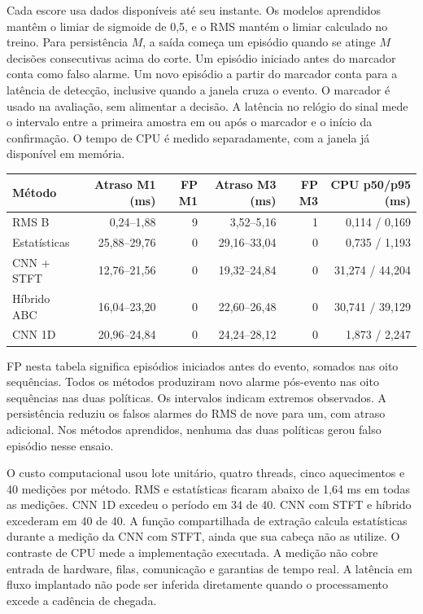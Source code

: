 \documentclass[11pt,a4paper]{article}
\begin{document}
Cada escore usa dados disponíveis até seu instante. Os modelos aprendidos mantêm o limiar de sigmoide de 0,5, e o RMS mantém o limiar calculado no treino. Para persistência $M$, a saída começa um episódio quando se atinge $M$ decisões consecutivas acima do corte. Um episódio iniciado antes do marcador conta como falso alarme. Um novo episódio a partir do marcador conta para a latência de detecção, inclusive quando a janela cruza o evento. O marcador é usado na avaliação, sem alimentar a decisão. A latência no relógio do sinal mede o intervalo entre a primeira amostra em ou após o marcador e o início da confirmação. O tempo de CPU é medido separadamente, com a janela já disponível em memória.

\begin{center}
\small
\begin{tabular}{@{}lrrrrr@{}}\toprule
Método & Atraso M1 (ms) & FP M1 & Atraso M3 (ms) & FP M3 & CPU p50/p95 (ms)\\\midrule
RMS B & 0,24--1,88 & 9 & 3,52--5,16 & 1 & 0,114 / 0,169\\
Estatísticas & 25,88--29,76 & 0 & 29,16--33,04 & 0 & 0,735 / 1,193\\
CNN + STFT & 12,76--21,56 & 0 & 19,32--24,84 & 0 & 31,274 / 44,204\\
Híbrido ABC & 16,04--23,20 & 0 & 22,60--26,48 & 0 & 30,741 / 39,129\\
CNN 1D & 20,96--24,84 & 0 & 24,24--28,12 & 0 & 1,873 / 2,247\\\bottomrule
\end{tabular}
\end{center}
FP nesta tabela significa episódios iniciados antes do evento, somados nas oito sequências. Todos os métodos produziram novo alarme pós-evento nas oito sequências nas duas políticas. Os intervalos indicam extremos observados. A persistência reduziu os falsos alarmes do RMS de nove para um, com atraso adicional. Nos métodos aprendidos, nenhuma das duas políticas gerou falso episódio nesse ensaio.

O custo computacional usou lote unitário, quatro threads, cinco aquecimentos e 40 medições por método. RMS e estatísticas ficaram abaixo de 1,64 ms em todas as medições. CNN 1D excedeu o período em 34 de 40. CNN com STFT e híbrido excederam em 40 de 40. A função compartilhada de extração calcula estatísticas durante a medição da CNN com STFT, ainda que sua cabeça não as utilize. O contraste de CPU mede a implementação executada. A medição não cobre entrada de hardware, filas, comunicação e garantias de tempo real. A latência em fluxo implantado não pode ser inferida diretamente quando o processamento excede a cadência de chegada.
\end{document}
